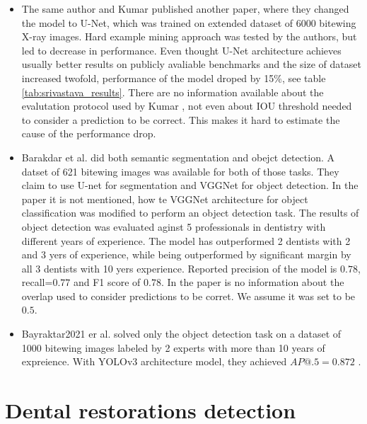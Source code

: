 \begin{itemize}
    \item{The same author and Kumar \cite{Kumar2018}} published another paper, where they changed the model to U-Net, which was trained on extended dataset of 6000 bitewing X-ray images. Hard example mining approach was tested by the authors, but led to decrease in performance. Even thought U-Net architecture achieves usually better results on publicly avaliable benchmarks \cite{paperwithcode,Zhang2019} and the size of dataset increased twofold, performance of the model droped by 15\%, see table \ref{tab:srivastava_results}. There are no information available about the evalutation protocol used by Kumar \cite{Kumar2018}, not even about IOU threshold needed to consider a prediction to be correct. This makes it hard to estimate the cause of the performance drop.
    \item{Barakdar et al. \cite{Bayrakdar2021}} did both semantic segmentation and obejct detection. A datset of 621 bitewing images was available for both of those tasks. They claim to use U-net for segmentation and VGGNet for object detection. In the paper it is not mentioned, how te VGGNet architecture for object classification was modified to perform an object detection task. The results of object detection was evaluated aginst 5 professionals in dentistry with different years of experience. The model has outperformed 2 dentists with 2 and 3 yers of experience, while being outperformed by significant margin by all 3 dentists with 10 yers experience. Reported precision of the model is $0.78$, recall=$0.77$ and F1 score of $0.78$. In the paper is no information about the overlap used to consider predictions to be corret. We assume it was set to be $0.5$.
    \item{Bayraktar2021 er al. \cite{Bayraktar2021}} solved only the object detection task on a dataset of 1000 bitewing images labeled by 2 experts with more than 10 years of expreience. With YOLOv3 architecture model, they achieved $AP@.5 = 0.872$ .
\end{itemize}

\section{Dental restorations detection}